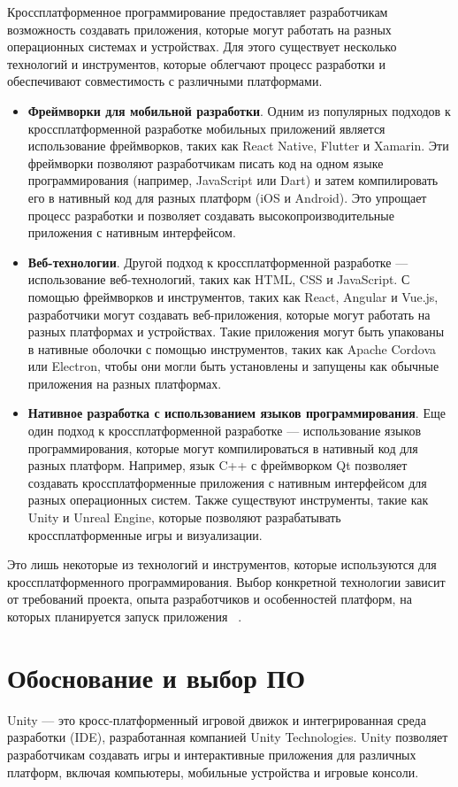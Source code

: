 Кроссплатформенное программирование предоставляет разработчикам возможность создавать приложения, которые могут работать на разных операционных системах и устройствах. Для этого существует несколько технологий и инструментов, которые облегчают процесс разработки и обеспечивают совместимость с различными платформами.
\begin{itemize}
    \item \textbf{Фреймворки для мобильной разработки}. Одним из популярных подходов к кроссплатформенной разработке мобильных приложений является использование фреймворков, таких как React Native, Flutter и Xamarin. Эти фреймворки позволяют разработчикам писать код на одном языке программирования (например, JavaScript или Dart) и затем компилировать его в нативный код для разных платформ (iOS и Android). Это упрощает процесс разработки и позволяет создавать высокопроизводительные приложения с нативным интерфейсом.
    \item \textbf{Веб-технологии}. Другой подход к кроссплатформенной разработке --- использование веб-технологий, таких как HTML, CSS и JavaScript. С помощью фреймворков и инструментов, таких как React, Angular и Vue.js, разработчики могут создавать веб-приложения, которые могут работать на разных платформах и устройствах. Такие приложения могут быть упакованы в нативные оболочки с помощью инструментов, таких как Apache Cordova или Electron, чтобы они могли быть установлены и запущены как обычные приложения на разных платформах.
    \item \textbf{Нативное разработка с использованием языков программирования}. Еще один подход к кроссплатформенной разработке --- использование языков программирования, которые могут компилироваться в нативный код для разных платформ. Например, язык C++ с фреймворком Qt позволяет создавать кроссплатформенные приложения с нативным интерфейсом для разных операционных систем. Также существуют инструменты, такие как Unity и Unreal Engine, которые позволяют разрабатывать кроссплатформенные игры и визуализации.
\end{itemize}

Это лишь некоторые из технологий и инструментов, которые используются для кроссплатформенного программирования. Выбор конкретной технологии зависит от требований проекта, опыта разработчиков и особенностей платформ, на которых планируется запуск приложения ~\cite{book1author}.

\section{\label{sec:ch01/sec03} Обоснование и выбор ПО}
Unity --- это кросс-платформенный игровой движок и интегрированная среда разработки (IDE), разработанная компанией Unity Technologies. Unity позволяет разработчикам создавать игры и интерактивные приложения для различных платформ, включая компьютеры, мобильные устройства и игровые консоли.

